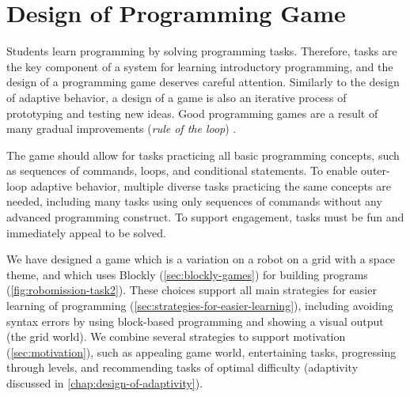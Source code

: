 \chapter{Design of Programming Game}
\label{chap:design-of-game}


Students learn programming by solving programming tasks.
Therefore, tasks are the key component of a system for learning introductory
programming, and the design of a programming game deserves careful attention.
Similarly to the design of adaptive behavior, a design of a game is also an iterative
process of prototyping and testing new ideas.
Good programming games are a result of many gradual improvements
(\emph{rule of the loop}) \cite{book-of-lenses}.


The game should allow for tasks practicing all basic
programming concepts, such as sequences of commands, loops, and conditional
statements. %
To enable outer-loop adaptive behavior, multiple diverse tasks practicing the same
concepts are needed, including many tasks using only sequences of commands
without any advanced programming construct.
To support engagement, tasks must be fun and immediately appeal to be
solved.  %


We have designed a game which is a variation on a robot
on a grid with a space theme, and which uses Blockly (\cref{sec:blockly-games})
for building programs
(\cref{fig:robomission-task2}).
These choices support all main strategies for easier learning of programming
(\cref{sec:strategies-for-easier-learning}),
including
avoiding syntax errors by using block-based programming and
showing a visual output (the grid world).
We combine several strategies to support motivation (\cref{sec:motivation}),
such as appealing game world, entertaining tasks, progressing through levels,
and recommending tasks of optimal difficulty
(adaptivity discussed in \cref{chap:design-of-adaptivity}).

